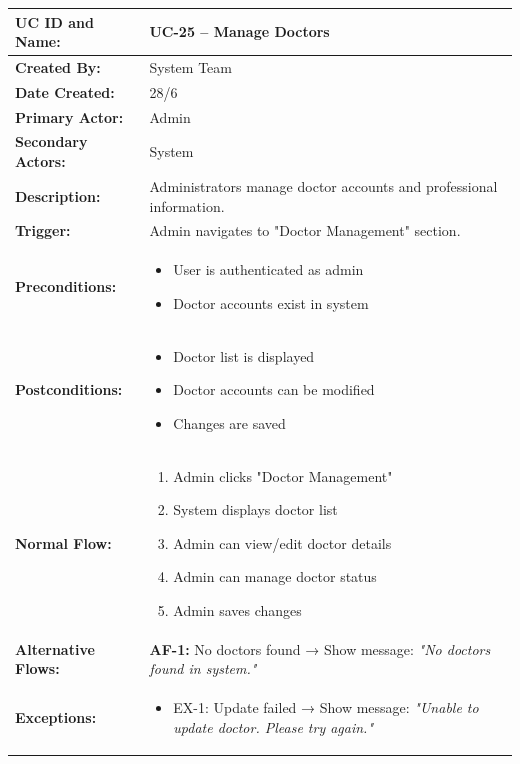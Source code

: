 \documentclass[12pt,a4paper]{article}
\begin{document}
\renewcommand{\arraystretch}{1.5}
\begin{longtable}{|p{4.5cm}|p{10.5cm}|}
\hline
\textbf{UC ID and Name:} & UC-25 – Manage Doctors \\
\hline
\textbf{Created By:} & System Team \\
\hline
\textbf{Date Created:} & 28/6 \\
\hline
\textbf{Primary Actor:} & Admin \\
\hline
\textbf{Secondary Actors:} & System \\
\hline
\textbf{Description:} & Administrators manage doctor accounts and professional information. \\
\hline
\textbf{Trigger:} & Admin navigates to "Doctor Management" section. \\
\hline
\textbf{Preconditions:} &
\begin{itemize}
  \item User is authenticated as admin
  \item Doctor accounts exist in system
\end{itemize} \\
\hline
\textbf{Postconditions:} &
\begin{itemize}
  \item Doctor list is displayed
  \item Doctor accounts can be modified
  \item Changes are saved
\end{itemize} \\
\hline
\textbf{Normal Flow:} &
\begin{enumerate}
  \item Admin clicks "Doctor Management"
  \item System displays doctor list
  \item Admin can view/edit doctor details
  \item Admin can manage doctor status
  \item Admin saves changes
\end{enumerate} \\
\hline
\textbf{Alternative Flows:} &
\textbf{AF-1:} No doctors found → Show message: \textit{"No doctors found in system."} \\
\hline
\textbf{Exceptions:} &
\begin{itemize}
  \item EX-1: Update failed → Show message: \textit{"Unable to update doctor. Please try again."}
\end{itemize} \\

\end{longtable}
\end{document}
